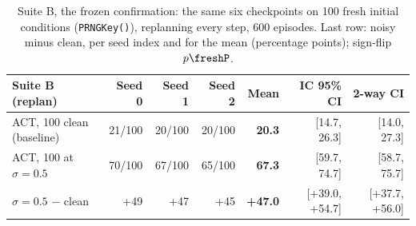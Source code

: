 \begin{table}[t]
\centering
\scriptsize
%
\begin{tabular}{lrrrrrr}
\toprule
Suite B (replan) & Seed 0 & Seed 1 & Seed 2 & Mean & IC 95\% CI & 2-way CI \\
\midrule
ACT, 100 clean (baseline) & 21/100 & 20/100 & 20/100 & \textbf{20.3} & [14.7, 26.3] & [14.0, 27.3] \\
ACT, 100 at $\sigma{=}0.5$ & 70/100 & 67/100 & 65/100 & \textbf{67.3} & [59.7, 74.7] & [58.7, 75.7] \\
\midrule
$\sigma{=}0.5$ $-$ clean & +49 & +47 & +45 & \textbf{+47.0} & [+39.0, +54.7] & [+37.7, +56.0] \\
\bottomrule
\end{tabular}
%
\caption{Suite B, the frozen confirmation: the same six checkpoints on 100 fresh initial conditions (\texttt{PRNGKey(\freshBase)}), replanning every step, 600 episodes. Last row: noisy minus clean, per seed index and for the mean (percentage points); sign-flip $p\freshP$.}
\label{tab:fresh}
\end{table}
